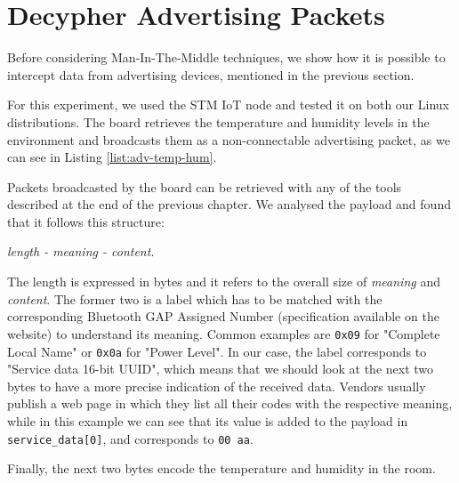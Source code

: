 \section{Decypher Advertising Packets}
Before considering Man-In-The-Middle techniques, we show how it is possible to intercept data from advertising devices, mentioned in the previous section.

For this experiment, we used the STM IoT node and tested it on both our Linux distributions. The board retrieves the temperature and humidity levels in the environment and broadcasts them as a non-connectable advertising packet, as we can see in Listing \ref{list:adv-temp-hum}.


Packets broadcasted by the board can be retrieved with any of the tools described at the end of the previous chapter. We analysed the payload and found that it follows this structure:
\begin{center}
	\textit{length - meaning - content}.
\end{center}
The length is expressed in bytes and it refers to the overall size of \textit{meaning} and \textit{content}. The former two is a label which has to be matched with the corresponding Bluetooth GAP Assigned Number (specification available on the website) to understand its meaning. Common examples are \texttt{0x09} for "Complete Local Name" or \texttt{0x0a} for "Power Level". In our case, the label corresponds to "Service data 16-bit UUID", which means that we should look at the next two bytes to have a more precise indication of the received data. Vendors usually publish a web page in which they list all their codes with the respective meaning, while in this example we can see that its value is added to the payload in \texttt{service\_data[0]}, and corresponds to \texttt{00 aa}.

Finally, the next two bytes encode the temperature and humidity in the room.